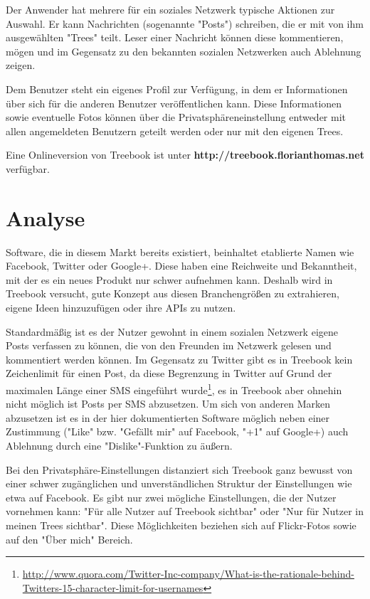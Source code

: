 \documentclass[10pt,a4paper]{book}
\begin{document}
Der Anwender hat mehrere für ein soziales Netzwerk typische Aktionen zur Auswahl. Er kann Nachrichten (sogenannte "Posts") schreiben, die er 
mit von ihm ausgewählten "Trees" teilt. Leser einer Nachricht können diese kommentieren, mögen und im Gegensatz zu den bekannten sozialen 
Netzwerken auch Ablehnung zeigen.

Dem Benutzer steht ein eigenes Profil zur Verfügung, in dem er Informationen über sich für die anderen Benutzer veröffentlichen kann. Diese 
Informationen sowie eventuelle Fotos können über die Privatsphäreneinstellung entweder mit allen angemeldeten Benutzern geteilt werden oder 
nur mit den eigenen Trees.

Eine Onlineversion von Treebook ist unter \textbf{http://treebook.florianthomas.net} verfügbar.
\chapter{Analyse}
Software, die in diesem Markt bereits existiert, beinhaltet etablierte Namen wie Facebook, Twitter oder Google+. Diese haben eine Reichweite und Bekanntheit, mit der es ein neues Produkt nur schwer aufnehmen kann. Deshalb wird in Treebook versucht, gute Konzept aus diesen Branchengrößen zu extrahieren, eigene Ideen hinzuzufügen oder ihre APIs zu nutzen.

Standardmäßig ist es der Nutzer gewohnt in einem sozialen Netzwerk eigene Posts verfassen zu können, die von den Freunden im Netzwerk gelesen und kommentiert werden können. Im Gegensatz zu Twitter gibt es in Treebook kein Zeichenlimit für einen Post, da diese Begrenzung in Twitter auf Grund der maximalen Länge einer SMS eingeführt wurde\footnote{\href{http://www.quora.com/Twitter-Inc-company/What-is-the-rationale-behind-Twitters-15-character-limit-for-usernames}{http://www.quora.com/Twitter-Inc-company/What-is-the-rationale-behind-Twitters-15-character-limit-for-usernames}}, es in Treebook aber ohnehin nicht möglich ist Posts per SMS abzusetzen.
Um sich von anderen Marken abzusetzen ist es in der hier dokumentierten Software möglich neben einer Zustimmung ("Like" bzw. "Gefällt mir" auf Facebook, "+1" auf Google+) auch Ablehnung durch eine "Dislike"-Funktion zu äußern.

Bei den Privatsphäre-Einstellungen distanziert sich Treebook ganz bewusst von einer schwer zugänglichen und unverständlichen Struktur der Einstellungen wie etwa auf Facebook. Es gibt nur zwei mögliche Einstellungen, die der Nutzer vornehmen kann: "Für alle Nutzer auf Treebook sichtbar" oder "Nur für Nutzer in meinen Trees sichtbar". Diese Möglichkeiten beziehen sich auf Flickr-Fotos sowie auf den "Über mich" Bereich.
\end{document}

